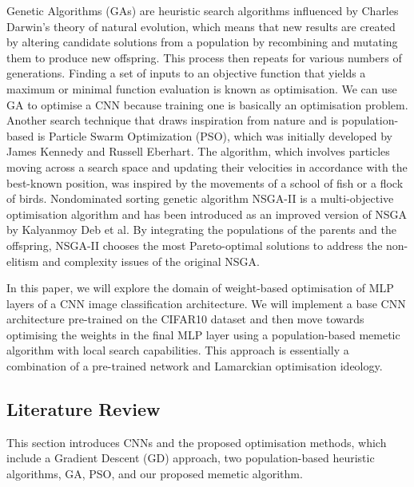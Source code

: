 \documentclass[conference]{IEEEtran}
\begin{document}
\par
Genetic Algorithms (GAs) are heuristic search algorithms influenced by Charles Darwin's theory of natural evolution, which means that new results are created by altering candidate solutions from a population by recombining and mutating them to produce new offspring. This process then repeats for various numbers of generations. Finding a set of inputs to an objective function that yields a maximum or minimal function evaluation is known as optimisation. We can use GA to optimise a CNN because training one is basically an optimisation problem. 
Another search technique that draws inspiration from nature and is population-based is Particle Swarm Optimization (PSO)\cite{PSO}, which was initially developed by James Kennedy and Russell Eberhart. The algorithm, which involves particles moving across a search space and updating their velocities in accordance with the best-known position, was inspired by the movements of a school of fish or a flock of birds.
Nondominated sorting genetic algorithm NSGA-II\cite{NSGA2}  is a multi-objective optimisation algorithm and has been introduced as an improved version of NSGA by Kalyanmoy Deb et al. By integrating the populations of the parents and the offspring, NSGA-II chooses the most Pareto-optimal solutions to address the non-elitism and complexity issues of the original NSGA.
\par
In this paper, we will explore the domain of weight-based optimisation of MLP layers of a CNN image classification architecture. We will implement a base CNN architecture pre-trained on the CIFAR10 dataset and then move towards optimising the weights in the final MLP layer using a population-based memetic algorithm with local search capabilities. This approach is essentially a combination of a pre-trained network and Lamarckian optimisation ideology.

\subsection{Literature Review}
This section introduces CNNs and the proposed optimisation methods, which include a Gradient Descent (GD) approach, two population-based heuristic algorithms, GA, PSO, and our proposed memetic algorithm.
\end{document}
